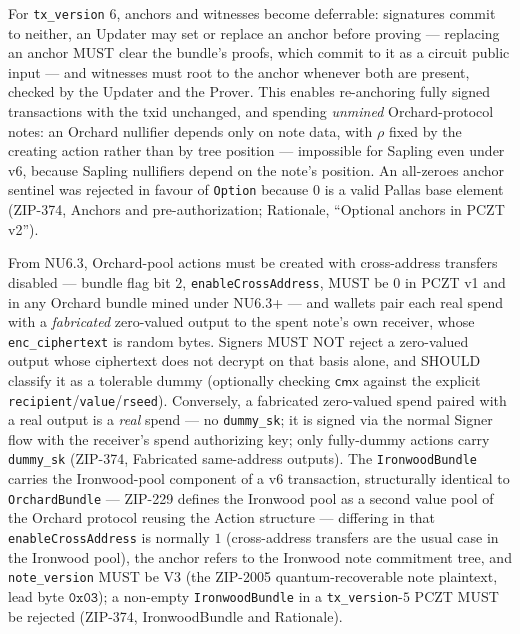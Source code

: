 \documentclass[11pt,a4paper]{article}
\theoremstyle{definition}
\newcommand{\cmx}{\mathsf{cmx}}
\begin{document}
For \texttt{tx\_version} $6$, anchors and witnesses become deferrable:
signatures commit to neither, an Updater may set or replace an anchor
before proving --- replacing an anchor MUST clear the bundle's proofs,
which commit to it as a circuit public input --- and witnesses must root
to the anchor whenever both are present, checked by the Updater and the
Prover. This enables re-anchoring fully signed transactions with the txid
unchanged, and spending \emph{unmined} Orchard-protocol notes: an Orchard
nullifier depends only on note data, with $\rho$ fixed by the creating
action rather than by tree position --- impossible for Sapling even under
v6, because Sapling nullifiers depend on the note's position. An
all-zeroes anchor sentinel was rejected in favour of \texttt{Option}
because $0$ is a valid Pallas base element (ZIP-374, Anchors and
pre-authorization; Rationale, ``Optional anchors in PCZT v2'').

From NU6.3, Orchard-pool actions must be created with cross-address
transfers disabled --- bundle flag bit $2$, \texttt{enableCrossAddress},
MUST be $0$ in PCZT v1 and in any Orchard bundle mined under NU6.3+ ---
and wallets pair each real spend with a \emph{fabricated} zero-valued
output to the spent note's own receiver, whose \texttt{enc\_ciphertext}
is random bytes. Signers MUST NOT reject a zero-valued output whose
ciphertext does not decrypt on that basis alone, and SHOULD classify it
as a tolerable dummy (optionally checking $\cmx$ against the explicit
\texttt{recipient}/\texttt{value}/\texttt{rseed}). Conversely, a
fabricated zero-valued spend paired with a real output is a \emph{real}
spend --- no \texttt{dummy\_sk}; it is signed via the normal Signer flow
with the receiver's spend authorizing key; only fully-dummy actions carry
\texttt{dummy\_sk} (ZIP-374, Fabricated same-address outputs). The
\texttt{IronwoodBundle} carries the Ironwood-pool component of a v6
transaction, structurally identical to \texttt{OrchardBundle} --- ZIP-229
defines the Ironwood pool as a second value pool of the Orchard protocol
reusing the Action structure --- differing in that
\texttt{enableCrossAddress} is normally $1$ (cross-address transfers are
the usual case in the Ironwood pool), the anchor refers to the Ironwood
note commitment tree, and \texttt{note\_version} MUST be V3 (the ZIP-2005
quantum-recoverable note plaintext, lead byte $\mathtt{0x03}$); a
non-empty \texttt{IronwoodBundle} in a \texttt{tx\_version}-$5$ PCZT MUST
be rejected (ZIP-374, IronwoodBundle and Rationale).
\end{document}
